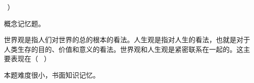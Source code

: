 ~）
\par{}
\begin{solution}概念记忆题。
\end{solution}
\question 世界观是指人们对世界的总的根本的看法。人生观是指对人生的看法，也就是对于人类生存的目的、价值和意义的看法。世界观和人生观是紧密联系在一起的。这主要表现在（
~）
\par{}
\begin{solution}本题难度很小，书面知识记忆。
\end{solution}
